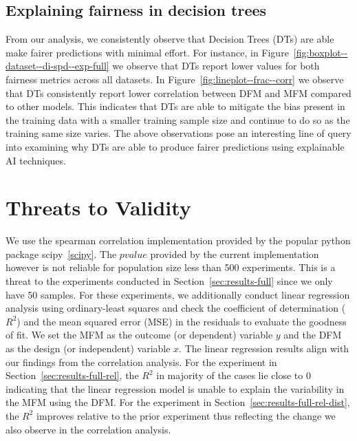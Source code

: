 \documentclass{article}
\begin{document}
\subsection{Explaining fairness in decision trees}\label{sec:discuss-explain-fair-dt}


From our analysis, we consistently observe that Decision Trees (DTs)
are able make fairer predictions with minimal effort. For instance, in
Figure \ref{fig:boxplot--dataset--di-spd--exp-full} we observe that
DTs report lower values for both fairness metrics across all datasets.
In Figure \ref{fig:lineplot--frac--corr} we observe that DTs
consistently report lower correlation between DFM and MFM compared to
other models. This indicates that DTs are able to mitigate the bias
present in the training data with a smaller training sample size and
continue to do so as the training same size varies. The above
observations pose an interesting line of query into examining why DTs
are able to produce fairer predictions using explainable AI
techniques.

\section{Threats to Validity}\label{sec:threats}

We use the spearman correlation implementation provided by the popular
python package scipy \ref{scipy}. The $pvalue$ provided by the current
implementation however is not reliable for population size less than
500 experiments. This is a threat to the experiments conducted in
Section \ref{sec:results-full} since we only have 50 samples. For
these experiments, we additionally conduct linear regression analysis
using ordinary-least squares and check the coefficient of
determination ($R^2$) and the mean squared error (MSE) in the
residuals to evaluate the goodness of fit. We set the MFM as the
outcome (or dependent) variable $y$ and the DFM as the design (or
independent) variable $x$. The linear regression results align with
our findings from the correlation analysis. For the experiment in
Section \ref{sec:results-full-rel}, the $R^2$ in majority of the cases
lie close to 0 indicating that the linear regression model is unable
to explain the variability in the MFM using the DFM. For the
experiment in Section \ref{sec:results-full-rel-dist}, the $R^2$
improves relative to the prior experiment thus reflecting the change
we also observe in the correlation analysis.
\end{document}
